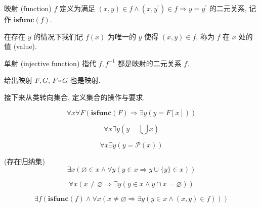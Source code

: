 \begin{definition}
    \label {definition:function (set)}
    映射 (function) \(f\) 定义为满足 \((x,y) \in f \land (x,y^\prime) \in f \Rightarrow y = y^\prime\) 的二元关系, 记作 \(\mathbf{isfunc} (f)\).

    在存在 \(y\) 的情况下我们记 \(f(x)\) 为唯一的 \(y\) 使得 \((x,y) \in f\), 称为 \(f\) 在 \(x\) 处的值 (value).
\end{definition}

\begin{definition}
    \label {definition:injective function (set)}
    单射 (injective function) 指代 \(f, f^{-1}\) 都是映射的二元关系 \(f\).
\end{definition}

\begin{corollary}
    给出映射 \(F, G\), \(F \circ G\) 也是映射.
\end{corollary}

接下来从类转向集合, 定义集合的操作与要求.

\begin{axiom*}
    \label {axiom:NBG Axiom of Replacement}
    \[
        \forall x \forall F (\mathbf{isfunc} (F) \Rightarrow \exists y (y = F[x]))
    \]
\end{axiom*}

\begin{axiom*}
    \label {axiom:NBG Axiom of Union}
    \[
        \forall x \exists y (y = \bigcup x)
    \]
\end{axiom*}

\begin{axiom*}
    \label {axiom:NBG Axiom of Power Set}
    \[
        \forall x \exists y (y = \mathcal{P} (x))
    \]
\end{axiom*}

\begin{axiom*}
    \label {axiom:NBG Axiom of Infinity} (存在归纳集)
    \[
        \exists x (\varnothing \in x \land \forall y (y \in x \Rightarrow y \cup \{y\} \in x))
    \]
\end{axiom*}

\begin{axiom*}
    \label {axiom:NBG Axiom of Foundation}
    \[
        \forall x (x \neq \varnothing \Rightarrow \exists y (y \in x \land y \cap x = \varnothing))
    \]
\end{axiom*}

\begin{axiom*}
    \label {axiom:NBG Axiom of Global Choice}
    \[
        \exists f (\mathbf{isfunc} (f) \land \forall x (x \neq \varnothing \Rightarrow \exists y (y \in x \land (x,y) \in f)))
    \]
\end{axiom*}

